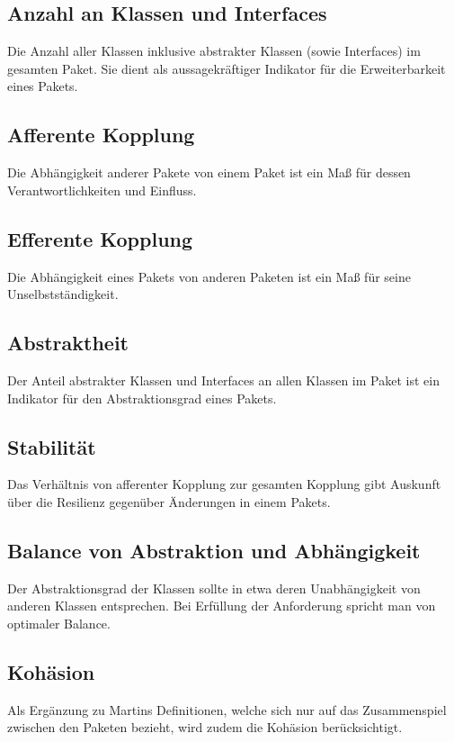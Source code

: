 \documentclass[10pt]{scrreprt}
\begin{document}
\subsection*{Anzahl an Klassen und Interfaces}
Die Anzahl aller Klassen inklusive abstrakter Klassen (sowie Interfaces) im gesamten Paket. Sie dient als aussagekräftiger Indikator für die Erweiterbarkeit eines Pakets.

\subsection*{Afferente Kopplung}
Die Abhängigkeit anderer Pakete von einem Paket ist ein Maß für dessen Verantwortlichkeiten und Einfluss.

\subsection*{Efferente Kopplung}
Die Abhängigkeit eines Pakets von anderen Paketen ist ein Maß für seine Unselbstständigkeit.

\subsection*{Abstraktheit}
Der Anteil abstrakter Klassen und Interfaces an allen Klassen im Paket ist ein Indikator für den Abstraktionsgrad eines Pakets.

\subsection*{Stabilität}
Das Verhältnis von afferenter Kopplung zur gesamten Kopplung gibt Auskunft über die Resilienz gegenüber Änderungen in einem Pakets.

\subsection*{Balance von Abstraktion und Abhängigkeit}
Der Abstraktionsgrad der Klassen sollte in etwa deren Unabhängigkeit von anderen Klassen entsprechen. Bei Erfüllung der Anforderung spricht man von optimaler Balance.

\subsection*{Kohäsion}
Als Ergänzung zu Martins Definitionen, welche sich nur auf das Zusammenspiel zwischen den Paketen bezieht, wird zudem die Kohäsion berücksichtigt.\\
\end{document}
